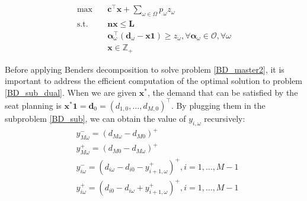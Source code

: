 \begin{equation}\label{BD_master2}
  \begin{aligned}
    \max \quad & \mathbf{c}^{\intercal} \mathbf{x} + \sum_{\omega \in \Omega} p_{\omega} z_{\omega} \\
    \text {s.t.} \quad & \mathbf{n} \mathbf{x} \leq \mathbf{L} \\
    & \bm{\alpha}_{\omega}^{\intercal}(\mathbf{d}_{\omega}- \mathbf{x} \mathbf{1}) \geq z_{\omega}, \forall \bm{\alpha}_{\omega} \in \mathcal{O}, \forall \omega \\
     & \mathbf{x} \in \mathbb{Z}_{+}
  \end{aligned}
\end{equation}






Before applying Benders decomposition to solve problem \eqref{BD_master2}, it is important to address the efficient computation of the optimal solution to problem \eqref{BD_sub_dual}.
When we are given $\mathbf{x}^{*}$, the demand that can be satisfied by the seat planning is $\mathbf{x}^{*} \mathbf{1} = \mathbf{d}_0 = (d_{1,0},\ldots,d_{M,0})^{\intercal}$.
By plugging them in the subproblem \eqref{BD_sub}, we can obtain the value of $y_{i, \omega}$ recursively:
\begin{equation}\label{y_recursively}
\begin{aligned}
  & y_{M \omega}^{-}=\left(d_{M \omega}-d_{M 0}\right)^{+} \\
  & y_{M \omega}^{+}=\left(d_{M 0}-d_{M \omega}\right)^{+} \\
  & y_{i \omega}^{-}=\left(d_{i \omega}-d_{i 0} - y_{i+1, \omega}^{+} \right)^{+}, i =1,\ldots, M-1 \\
  & y_{i \omega}^{+}=\left(d_{i 0}- d_{i \omega} + y_{i+1, \omega}^{+}\right)^{+}, i =1,\ldots, M-1
\end{aligned}
\end{equation}

